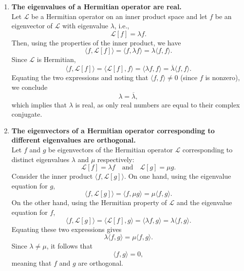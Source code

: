 \documentclass{report}
\begin{document}
\begin{enumerate}
  \item \textbf{The eigenvalues of a Hermitian operator are real.} \\
    Let \(\mathcal{L}\) be a Hermitian operator on an inner product space and let \(f\) be an eigenvector of \(\mathcal{L}\) with eigenvalue \(\lambda\), i.e.,
    \[
    \mathcal{L}[f] = \lambda f.
    \]
    Then, using the properties of the inner product, we have
    \[
    \langle f, \mathcal{L}[f] \rangle = \langle f, \lambda f \rangle = \lambda \langle f, f \rangle.
    \]
    Since \(\mathcal{L}\) is Hermitian,
    \[
    \langle f, \mathcal{L}[f] \rangle = \langle \mathcal{L}[f], f \rangle = \langle \lambda f, f \rangle = \overline{\lambda}\langle f, f \rangle.
    \]
    Equating the two expressions and noting that \(\langle f, f \rangle \neq 0\) (since \(f\) is nonzero), we conclude
    \[
    \lambda = \overline{\lambda},
    \]
    which implies that \(\lambda\) is real, as only real numbers are equal to their complex conjugate.

  \item \textbf{The eigenvectors of a Hermitian operator corresponding to different eigenvalues are orthogonal.} \\
    Let \(f\) and \(g\) be eigenvectors of the Hermitian operator \(\mathcal{L}\) corresponding to distinct eigenvalues \(\lambda\) and \(\mu\) respectively:
    \[
    \mathcal{L}[f] = \lambda f \quad \text{and} \quad \mathcal{L}[g] = \mu g.
    \]
    Consider the inner product \(\langle f, \mathcal{L}[g] \rangle\). On one hand, using the eigenvalue equation for \(g\),
    \[
    \langle f, \mathcal{L}[g] \rangle = \langle f, \mu g \rangle = \mu \langle f, g \rangle.
    \]
    On the other hand, using the Hermitian property of \(\mathcal{L}\) and the eigenvalue equation for \(f\),
    \[
    \langle f, \mathcal{L}[g] \rangle = \langle \mathcal{L}[f], g \rangle = \langle \lambda f, g \rangle = \lambda \langle f, g \rangle.
    \]
    Equating these two expressions gives
    \[
    \lambda \langle f, g \rangle = \mu \langle f, g \rangle.
    \]
    Since \(\lambda \neq \mu\), it follows that
    \[
    \langle f, g \rangle = 0,
    \]
    meaning that \(f\) and \(g\) are orthogonal.
\end{enumerate}
\end{document}

